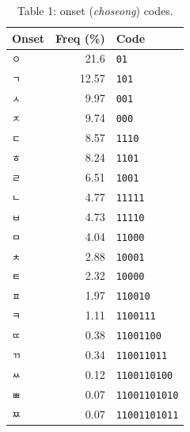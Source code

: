 \documentclass[conference]{IEEEtran}
\begin{document}
\begin{table}[H]
\centering
\small
\caption{Table 1: onset (\emph{choseong}) codes.}
\begin{tabular}{lrl}
\toprule
Onset & Freq (\%) & Code \\
\midrule
\texttt{ㅇ} & 21.6 & \texttt{01} \\
\texttt{ㄱ} & 12.57 & \texttt{101} \\
\texttt{ㅅ} & 9.97 & \texttt{001} \\
\texttt{ㅈ} & 9.74 & \texttt{000} \\
\texttt{ㄷ} & 8.57 & \texttt{1110} \\
\texttt{ㅎ} & 8.24 & \texttt{1101} \\
\texttt{ㄹ} & 6.51 & \texttt{1001} \\
\texttt{ㄴ} & 4.77 & \texttt{11111} \\
\texttt{ㅂ} & 4.73 & \texttt{11110} \\
\texttt{ㅁ} & 4.04 & \texttt{11000} \\
\texttt{ㅊ} & 2.88 & \texttt{10001} \\
\texttt{ㅌ} & 2.32 & \texttt{10000} \\
\texttt{ㅍ} & 1.97 & \texttt{110010} \\
\texttt{ㅋ} & 1.11 & \texttt{1100111} \\
\texttt{ㄸ} & 0.38 & \texttt{11001100} \\
\texttt{ㄲ} & 0.34 & \texttt{110011011} \\
\texttt{ㅆ} & 0.12 & \texttt{1100110100} \\
\texttt{ㅃ} & 0.07 & \texttt{11001101010} \\
\texttt{ㅉ} & 0.07 & \texttt{11001101011} \\
\bottomrule
\end{tabular}
\end{table}
\end{document}
